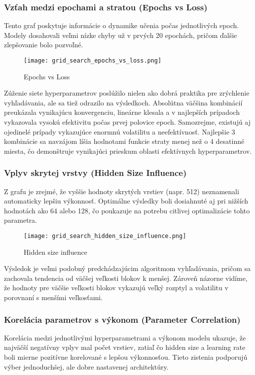 \subsubsection{Vzťah medzi epochami a stratou (Epochs vs Loss)}
Tento graf poskytuje informácie o dynamike učenia počas jednotlivých epoch. Modely dosahovali veľmi nízke chyby už v prvých 20 epochách, pričom ďalšie zlepšovanie bolo pozvoľné.

\begin{figure}[ht!]
\centering
\texttt{[image: grid\_search\_epochs\_vs\_loss.png]}
\caption{Epochs vs Loss}
\label{fig:grid_search_epochs_vs_loss}
\end{figure}

Zúženie siete hyperparametrov poslúžilo nielen ako dobrá praktika pre zrýchlenie vyhľadávania, ale sa tiež odrazilo na výsledkoch. Absolútna väčšina kombinácií preukázala vynikajúcu konvergenciu, lineárne klesala a v najlepších prípadoch vykazovala vysokú efektivitu počas prvej polovice epoch. Samozrejme, existujú aj ojedinelé prípady vykazujúce enormnú volatilitu a neefektívnosť. Najlepšie 3 kombinácie sa navzájom líšia hodnotami funkcie straty menej než o 4 desatinné miesta, čo demonštruje vynikajúci prieskum oblasti efektívnych hyperparametrov.

\newpage

\subsubsection{Vplyv skrytej vrstvy (Hidden Size Influence)}
Z grafu je zrejmé, že vyššie hodnoty skrytých vrstiev (napr. 512) neznamenali automaticky lepšiu výkonnosť. Optimálne výsledky boli dosiahnuté aj pri nižších hodnotách ako 64 alebo 128, čo poukazuje na potrebu citlivej optimalizácie tohto parametra.

\begin{figure}[ht!]
\centering
\texttt{[image: grid\_search\_hidden\_size\_influence.png]}
\caption{Hidden size influence}
\label{fig:grid_search_hidden_size_influence}
\end{figure}

Výsledok je veľmi podobný predchádzajúcim algoritmom vyhľadávania, pričom sa zachovala tendencia od väčšej veľkosti blokov k menšej. Zároveň názorne vidíme, že hodnoty pre väčšie veľkosti blokov vykazujú veľký rozptyl a volatilitu v porovnaní s menšími veľkosťami.

\newpage

\subsubsection{Korelácia parametrov s výkonom (Parameter Correlation)}
Korelácia medzi jednotlivými hyperparametrami a výkonom modelu ukazuje, že najväčší negatívny vplyv mal počet vrstiev, zatiaľ čo hidden size a learning rate boli mierne pozitívne korelované s lepšou výkonnosťou. Tieto zistenia podporujú výber jednoduchšej, ale dobre nastavenej architektúry.

